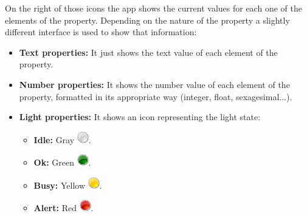                
On the right of those icons the app shows the current values for each one of the elements of the property. Depending on the nature of the property a slightly different interface is used to show that information:



\begin{itemize}
  \item \textbf{Text properties:} It just shows the text value of each element of the property.
  \item \textbf{Number properties:} It shows the number value of each element of the property, formatted in its appropriate way (integer, float, sexagesimal...).
  \item \textbf{Light properties:} It shows an icon representing the light state:
    \begin{itemize}
      \item \textbf{Idle:} Gray \includegraphics[width=0.5cm]{../images/grey_light_32.png}.
      \item \textbf{Ok:} Green \includegraphics[width=0.5cm]{../images/green_light_32.png}.
      \item \textbf{Busy:} Yellow \includegraphics[width=0.5cm]{../images/yellow_light_32.png}.
      \item \textbf{Alert:} Red \includegraphics[width=0.5cm]{../images/red_light_32.png}.
    \end{itemize}
  

\end{itemize}
